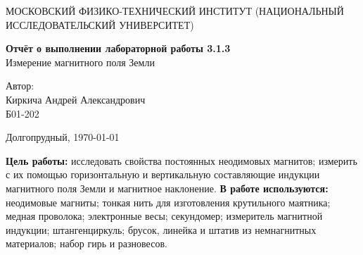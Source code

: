 



\begin{center}
{\large МОСКОВСКИЙ ФИЗИКО-ТЕХНИЧЕСКИЙ ИНСТИТУТ (НАЦИОНАЛЬНЫЙ ИССЛЕДОВАТЕЛЬСКИЙ УНИВЕРСИТЕТ)}
\end{center}
	
\vspace{4.5cm}
{\huge
\begin{center}
{\bf Отчёт о выполнении лабораторной работы 3.1.3}\\	
Измерение магнитного поля Земли		
\end{center}
}
\vspace{2cm}
\begin{flushright}
{\LARGE Автор:\\ Киркича Андрей Александрович \\
\vspace{0.2cm}
Б01-202}
\end{flushright}
\vspace{4cm}
\begin{center}
Долгопрудный, \today
\end{center}

\newpage
\n
	\textbf{Цель работы: }
	исследовать свойства постоянных неодимовых магнитов; измерить с их помощью горизонтальную и вертикальную составляющие индукции магнитного поля Земли и магнитное наклонение.
	\n\n
	\textbf{В работе используются: }
	неодимовые магниты; тонкая нить для изготовления крутильного маятника; медная проволока; электронные весы; секундомер; измеритель магнитной индукции; штангенциркуль; брусок, линейка и штатив из немнагнитных материалов; набор гирь и разновесов.
